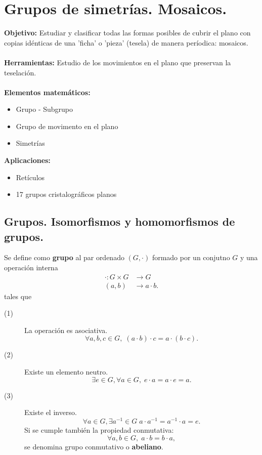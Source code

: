 \chapter{Grupos de simetrías. Mosaicos.}

\textbf{Objetivo:} Estudiar y clasificar todas las formas posibles de cubrir el plano con copias idénticas de una 'ficha' o 'pieza' (tesela) de manera períodica: mosaicos. \\ \\
\textbf{Herramientas:} Estudio de los movimientos en el plano que preservan la teselación. \\ \\
\textbf{Elementos matemáticos:} 
\begin{itemize}
\item Grupo - Subgrupo
\item Grupo de movimento en el plano
\item Simetrías
\end{itemize}
\textbf{Aplicaciones:}
\begin{itemize}
\item Retículos
\item 17 grupos cristalográficos planos
\end{itemize}

\section{Grupos. Isomorfismos y homomorfismos de grupos.}

\begin{fdefinition}[Grupo]
\normalfont Se define como \textbf{grupo} al par ordenado $\displaystyle \left(G, \cdot\right) $ formado por un conjutno $\displaystyle G $ y una operación interna
\[
\begin{split}
	\cdot : G \times G & \to G \\
\left(a,b\right) & \to a \cdot b .
\end{split}
\]
tales que
\begin{description}
\item[(1)] La operación es asociativa. 
	\[\forall a, b, c \in G, \; \left(a \cdot b\right) \cdot c = a \cdot \left(b \cdot c\right) .\]
\item[(2)] Existe un elemento neutro.
	\[\exists e \in G, \forall a \in G, \; e \cdot a = a \cdot e = a .\]
\item[(3)] Existe el inverso. 
	\[\forall a \in G, \exists a^{-1} \in G\; a \cdot a^{-1} = a^{-1} \cdot a = e .\]
Si se cumple también la propiedad conmutativa:
\[\forall a, b \in G, \; a \cdot b = b \cdot a ,\]
se denomina grupo conmutativo o \textbf{abeliano}.
\end{description}
\end{fdefinition}

